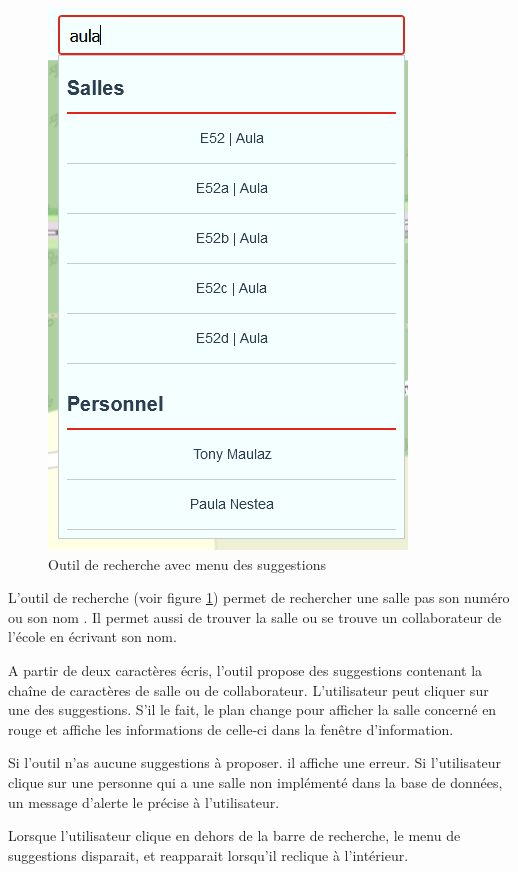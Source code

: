 \documentclass[
    iai, %
    il, %
]{heig-tb}
\begin{document}
\begin{figure}[h]
    \centering
    \includegraphics[scale=0.5]{frontend-recherche.png}
    \caption{Outil de recherche avec menu des suggestions}
    \label{fig:recherche}
\end{figure}


L'outil de recherche (voir figure \ref{fig:recherche}) permet de rechercher une salle pas son numéro ou son nom .
Il permet aussi de trouver la salle ou se trouve un collaborateur de l'école en écrivant son nom.

A partir de deux caractères écris, l'outil propose des suggestions contenant la chaîne de caractères de salle ou de collaborateur.
L'utilisateur peut cliquer sur une des suggestions.
S'il le fait, le plan change pour afficher la salle concerné en rouge et affiche les informations de celle-ci dans la fenêtre d'information.

Si l'outil n'as aucune suggestions à proposer. il affiche une erreur.
Si l'utilisateur clique sur une personne qui a une salle non implémenté dans la base de données,
un message d'alerte le précise à l'utilisateur.

Lorsque l'utilisateur clique en dehors de la barre de recherche, le menu de suggestions disparait,
et reapparait lorsqu'il reclique à l'intérieur.
\end{document}
